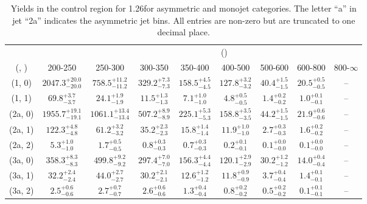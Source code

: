 \begin{table}[h!]
\tiny
\centering
\caption{Yields in the \mj control region for 1.26\ifb for asymmetric and monojet categories. The letter ``a'' in jet \eg ``2a''  indicates the asymmetric jet bins. All entries are non-zero but are truncated to one decimal place.\label{tab:yieldssep_wjetstolnuht_mu_asym}}
\begin{tabular}
{ccccccccc}
	\hline\hline
&	& \multicolumn{8}{c}{\scalht (\gev)} \\ 
	 (\njet,  \nb) & 200-250 & 250-300 & 300-350 & 350-400 & 400-500 & 500-600 & 600-800 & 800-$\infty$ \\ [0.8ex] 
\hline
	(1, 0) & $2047.3^{+ 20.0 }_{- 20.0 }$ & $758.5^{+ 11.2 }_{- 11.2 }$ & $329.2^{+ 7.3 }_{- 7.3 }$ & $158.5^{+ 4.5 }_{- 4.5 }$ & $127.8^{+ 3.2 }_{- 3.2 }$ & $40.4^{+ 1.5 }_{- 1.5 }$ & $20.5^{+ 0.5 }_{- 0.5 }$ & -- \\[0.5ex] 
	(1, 1) & $69.8^{+ 3.7 }_{- 3.7 }$ & $24.1^{+ 1.9 }_{- 1.9 }$ & $11.5^{+ 1.3 }_{- 1.3 }$ & $7.1^{+ 1.0 }_{- 1.0 }$ & $4.8^{+ 0.5 }_{- 0.5 }$ & $1.4^{+ 0.2 }_{- 0.2 }$ & $1.0^{+ 0.1 }_{- 0.1 }$ & -- \\[0.5ex] 
	(2a, 0) & $1955.7^{+ 19.1 }_{- 19.1 }$ & $1061.1^{+ 13.4 }_{- 13.4 }$ & $507.2^{+ 8.9 }_{- 8.9 }$ & $225.1^{+ 5.3 }_{- 5.3 }$ & $158.8^{+ 3.5 }_{- 3.5 }$ & $44.2^{+ 1.5 }_{- 1.5 }$ & $21.9^{+ 0.6 }_{- 0.6 }$ & -- \\[0.5ex] 
	(2a, 1) & $122.3^{+ 4.8 }_{- 4.8 }$ & $61.2^{+ 3.2 }_{- 3.2 }$ & $35.2^{+ 2.3 }_{- 2.3 }$ & $15.8^{+ 1.4 }_{- 1.4 }$ & $11.9^{+ 1.0 }_{- 1.0 }$ & $2.7^{+ 0.3 }_{- 0.3 }$ & $1.6^{+ 0.2 }_{- 0.2 }$ & -- \\[0.5ex] 
	(2a, 2) & $5.3^{+ 1.0 }_{- 1.0 }$ & $1.7^{+ 0.5 }_{- 0.5 }$ & $0.8^{+ 0.3 }_{- 0.3 }$ & $0.7^{+ 0.3 }_{- 0.3 }$ & $0.2^{+ 0.1 }_{- 0.1 }$ & $0.1^{+ 0.0 }_{- 0.0 }$ & $0.1^{+ 0.0 }_{- 0.0 }$ & -- \\[0.5ex] 
	(3a, 0) & $358.3^{+ 8.3 }_{- 8.3 }$ & $499.8^{+ 9.2 }_{- 9.2 }$ & $297.4^{+ 7.0 }_{- 7.0 }$ & $156.3^{+ 4.4 }_{- 4.4 }$ & $120.1^{+ 2.9 }_{- 2.9 }$ & $30.2^{+ 1.2 }_{- 1.2 }$ & $14.0^{+ 0.4 }_{- 0.4 }$ & -- \\[0.5ex] 
	(3a, 1) & $32.2^{+ 2.4 }_{- 2.4 }$ & $44.0^{+ 2.7 }_{- 2.7 }$ & $30.2^{+ 2.1 }_{- 2.1 }$ & $12.6^{+ 1.2 }_{- 1.2 }$ & $11.8^{+ 0.9 }_{- 0.9 }$ & $3.7^{+ 0.4 }_{- 0.4 }$ & $1.4^{+ 0.1 }_{- 0.1 }$ & -- \\[0.5ex] 
	(3a, 2) & $2.5^{+ 0.6 }_{- 0.6 }$ & $2.7^{+ 0.7 }_{- 0.7 }$ & $2.6^{+ 0.6 }_{- 0.6 }$ & $1.3^{+ 0.4 }_{- 0.4 }$ & $0.8^{+ 0.2 }_{- 0.2 }$ & $0.5^{+ 0.2 }_{- 0.2 }$ & $0.1^{+ 0.1 }_{- 0.1 }$ & -- \\[0.5ex] 

\end{tabular}
\end{table}
